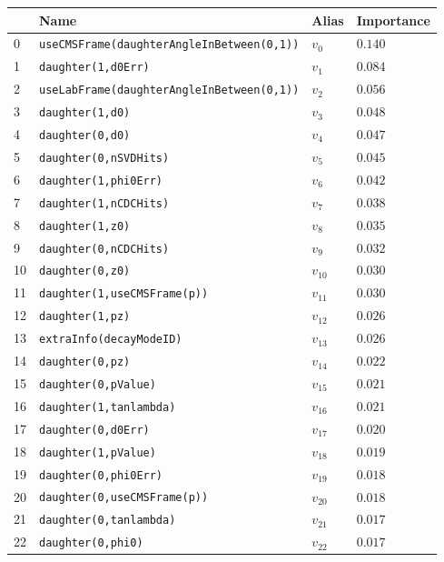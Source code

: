 \documentclass[headings=standardclasses,headings=big,oneside,a4paper,openany,12pt]{scrbook}
\begin{document}
\begin{longtable}{| p{} | p{} | p{} |p{} |}
\hline
& Name & Alias & Importance \\ \hline
0 &\texttt{useCMSFrame(daughterAngleInBetween(0,1))} & $v_{0}$ & $0.140$ \\ \hline
1 &\texttt{daughter(1,d0Err)} & $v_{1}$ & $0.084$ \\ \hline
2 &\texttt{useLabFrame(daughterAngleInBetween(0,1))} & $v_{2}$ & $0.056$ \\ \hline
3 &\texttt{daughter(1,d0)} & $v_{3}$ & $0.048$ \\ \hline
4 &\texttt{daughter(0,d0)} & $v_{4}$ & $0.047$ \\ \hline
5 &\texttt{daughter(0,nSVDHits)} & $v_{5}$ & $0.045$ \\ \hline
6 &\texttt{daughter(1,phi0Err)} & $v_{6}$ & $0.042$ \\ \hline
7 &\texttt{daughter(1,nCDCHits)} & $v_{7}$ & $0.038$ \\ \hline
8 &\texttt{daughter(1,z0)} & $v_{8}$ & $0.035$ \\ \hline
9 &\texttt{daughter(0,nCDCHits)} & $v_{9}$ & $0.032$ \\ \hline
10 &\texttt{daughter(0,z0)} & $v_{10}$ & $0.030$ \\ \hline
11 &\texttt{daughter(1,useCMSFrame(p))} & $v_{11}$ & $0.030$ \\ \hline
12 &\texttt{daughter(1,pz)} & $v_{12}$ & $0.026$ \\ \hline
13 &\texttt{extraInfo(decayModeID)} & $v_{13}$ & $0.026$ \\ \hline
14 &\texttt{daughter(0,pz)} & $v_{14}$ & $0.022$ \\ \hline
15 &\texttt{daughter(0,pValue)} & $v_{15}$ & $0.021$ \\ \hline
16 &\texttt{daughter(1,tanlambda)} & $v_{16}$ & $0.021$ \\ \hline
17 &\texttt{daughter(0,d0Err)} & $v_{17}$ & $0.020$ \\ \hline
18 &\texttt{daughter(1,pValue)} & $v_{18}$ & $0.019$ \\ \hline
19 &\texttt{daughter(0,phi0Err)} & $v_{19}$ & $0.018$ \\ \hline
20 &\texttt{daughter(0,useCMSFrame(p))} & $v_{20}$ & $0.018$ \\ \hline
21 &\texttt{daughter(0,tanlambda)} & $v_{21}$ & $0.017$ \\ \hline
22 &\texttt{daughter(0,phi0)} & $v_{22}$ & $0.017$ \\ \hline

\end{longtable}
\end{document}
